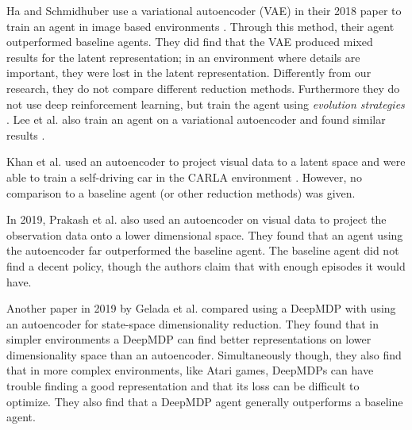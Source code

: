 Ha and Schmidhuber use a variational autoencoder (VAE) \cite{vae} in their 2018 paper to train an agent in image based environments \cite{rl_vae}. Through this method, their agent outperformed baseline agents. They did find that the VAE produced mixed results for the latent representation; in an environment where details are important, they were lost in the latent representation. Differently from our research, they do not compare different reduction methods. Furthermore they do not use deep reinforcement learning, but train the agent using \textit{evolution strategies} \cite{es}. Lee et al. also train an agent on a variational autoencoder and found similar results \cite{rl_vaetwo}.

Khan et al. used an autoencoder to project visual data to a latent space and were able to train a self-driving car in the CARLA environment \cite{rl_carla}\cite{carla}. However, no comparison to a baseline agent (or other reduction methods) was given.

In 2019, Prakash et al. \cite{AE_2019} also used an autoencoder on visual data to project the observation data onto a lower dimensional space. They found that an agent using the autoencoder far outperformed the baseline agent. The baseline agent did not find a decent policy, though the authors claim that with enough episodes it would have.

Another paper in 2019 by Gelada et al. \cite{deepmdp} compared using a DeepMDP with using an autoencoder for state-space dimensionality reduction. They found that in simpler environments a DeepMDP can find better representations on lower dimensionality space than an autoencoder. Simultaneously though, they also find that in more complex environments, like Atari games, DeepMDPs can have trouble finding a good representation and that its loss can be difficult to optimize. They also find that a DeepMDP agent generally outperforms a baseline agent. 



